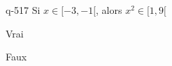 \begin{truefalse}{q-517}
Si $x\in [-3,-1[$, alors $x^2\in [1,9[$
\item Vrai
\item* Faux
\end{truefalse}

